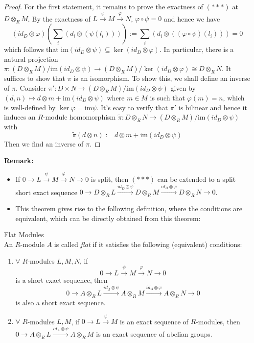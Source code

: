 \begin{proof}
    For the first statement, it remains to prove the exactness of $(***)$ at $D \otimes_R M$. By the exactness of $L \overset{\psi}{\to} M \overset{\varphi}{\to} N$, $\varphi \circ \psi=0$ and hence we have
    $$(id_D \otimes \varphi) (\sum_{i} (d_i \otimes (\psi(l_i)))) := \sum_i(d_i \otimes ((\varphi \circ \psi) (l_i))) =0$$
    which follows that $\text{im} (id_D \otimes \psi) \subseteq \ker (id_D \otimes \varphi)$. In particular, there is a natural projection $\pi :(D \otimes _R M)/ \text{im} (id_D \otimes \psi) \to (D \otimes_R M)/ \ker (id_D \otimes \varphi) \cong D \otimes _RN$. It suffices to show that $\pi$ is an isomorphism. To show this, we shall define an inverse of $\pi$. Consider $\pi' :D \times N \to (D \otimes_R M)/ \text{im} (id_D \otimes \psi)$ given by $(d,n) \mapsto d \otimes m + \text{im} (id_D \otimes \psi)$ where $m\in M$ is such that $\varphi (m) =n$, which is well-defined by $\ker \varphi =\text{im} \psi$. It's easy to verify that $\pi'$ is bilinear and hence it induces an $R$-module homomorphism $\tilde{\pi} :D \otimes_R N\to (D\otimes _RM)/ \text{im} (id_D \otimes \psi)$ with
    $$\tilde{\pi} (d \otimes n) := d \otimes m+ \text{im} (id_D \otimes \psi)$$
    Then we find an inverse of $\pi$.
\end{proof}

\noindent\textbf{Remark:} \begin{itemize}
    \item If $0 \to L \overset{\psi}{\to} M \overset{\varphi}{\to} N \to 0$ is split, then $(***)$ can be extended to a split short exact sequence $0 \to D\otimes_R L \overset{id_D \otimes \psi}{\longrightarrow} D\otimes_R M \overset{id_D \otimes \varphi}{\longrightarrow} D\otimes_R N \to0$.
    \item This theorem gives rise to the following definition, where the conditions are equivalent, which can be directly obtained from this theorem:
\end{itemize}



\begin{definition}{Flat Modules}\\
An $R$-module $A$ is called \textit{flat} if it satisfies the following (equivalent) conditions:
\begin{enumerate}
    \item $\forall$ $R$-modules $L,M,N$, if
    $$0 \to L \overset{\psi}{\to} M \overset{\varphi}{\to} N \to 0$$
    is a short exact sequence, then
    $$0 \overset{ }{\to} A\otimes_R L \overset{id_A \otimes \psi}{\longrightarrow} A\otimes_R M \overset{id_A \otimes \varphi}{\longrightarrow} A \otimes _RN \to0$$
    is also a short exact sequence.

    \item $\forall$ $R$-modules $L,M$, if $0 \to L \overset{\psi}{\to} M$ is an exact sequence of $R$-modules, then $0 \to A \otimes_R L\overset{id_A \otimes \psi}{\longrightarrow} A\otimes_R M$ is an exact sequence of abelian groups.
\end{enumerate}
\end{definition}

